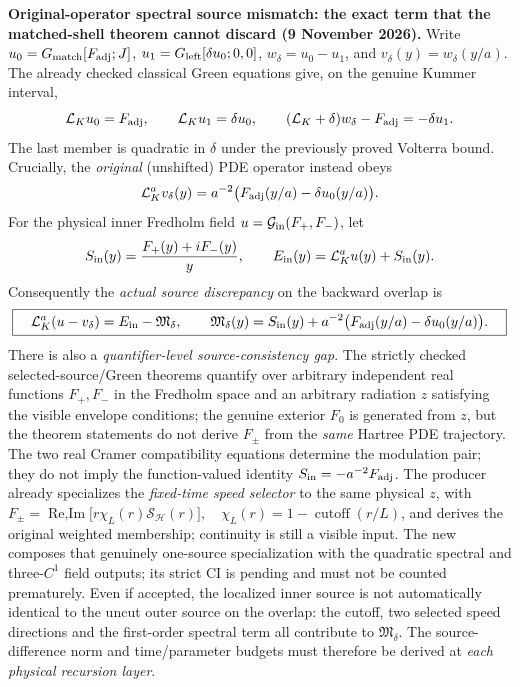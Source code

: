 \documentclass[11pt]{amsart}
\newcommand{\HH}{\mathcal H}
\begin{document}
\medskip
\noindent\textbf{Original-operator spectral source mismatch:
the exact term that the matched-shell theorem cannot discard
(9 November 2026).}
Write \(u_0=G_{\rm match}[F_{\rm adj};J]\),
\(u_1=G_{\rm left}[\delta u_0;0,0]\),
\(w_\delta=u_0-u_1\), and \(v_\delta(y)=w_\delta(y/a)\).
The already checked classical Green equations give, on the genuine
Kummer interval,
\[
 \mathcal L_Ku_0=F_{\rm adj},\qquad
 \mathcal L_Ku_1=\delta u_0,\qquad
 (\mathcal L_K+\delta)w_\delta-F_{\rm adj}
   =-\delta u_1.
\]
The last member is quadratic in \(\delta\) under the previously
proved Volterra bound.  Crucially, the \emph{original} (unshifted)
PDE operator instead obeys
\[
 \mathcal L_K^a v_\delta(y)
  =a^{-2}\bigl(F_{\rm adj}(y/a)
                  -\delta u_0(y/a)\bigr).
\]
For the physical inner Fredholm field
\(u=\mathcal G_{\rm in}(F_+,F_-)\), let
\[
 S_{\rm in}(y)=\frac{F_+(y)+iF_-(y)}{y},\qquad
 E_{\rm in}(y)=\mathcal L_K^a u(y)+S_{\rm in}(y).
\]
Consequently the \emph{actual source discrepancy} on the
backward overlap is
\[
 \boxed{\quad
 \mathcal L_K^a(u-v_\delta)
  =E_{\rm in}-\mathfrak M_\delta,\qquad
 \mathfrak M_\delta(y)
   =S_{\rm in}(y)+a^{-2}
     \bigl(F_{\rm adj}(y/a)-\delta u_0(y/a)\bigr).
 \quad}
\]
There is also a \emph{quantifier-level source-consistency gap}.
The strictly checked selected-source/Green theorems quantify over
arbitrary independent real functions \(F_+,F_-\) in the Fredholm
space and an arbitrary radiation \(z\) satisfying the visible
envelope conditions; the genuine exterior \(F_0\) is generated from
\(z\), but the theorem statements do not derive
\(F_\pm\) from the \emph{same} Hartree PDE trajectory.
The two real Cramer compatibility equations determine the
modulation pair; they do not imply the function-valued
identity \(S_{\rm in}=-a^{-2}F_{\rm adj}\).
The \texttt{}
producer already specializes the \emph{fixed-time speed selector}
to the same physical \(z\), with
\(F_\pm=\operatorname{Re,Im}\bigl[r\chi_L(r)
\mathcal S_{\HH}(r)\bigr],\quad\chi_L(r)=1-\operatorname{cutoff}(r/L)\), and derives the original
weighted membership; continuity is still a visible input.
The new \texttt{}
composes that genuinely one-source specialization with the
quadratic spectral and three-\(C^1\) field outputs; its
strict CI is pending and must not be counted prematurely.
Even if accepted, the localized inner source is not
automatically identical to the uncut outer source on the
overlap: the cutoff, two selected speed directions and the
first-order spectral term all contribute to
\(\mathfrak M_\delta\).
The source-difference norm and time/parameter budgets must
therefore be derived at \emph{each physical recursion layer}.
\end{document}
